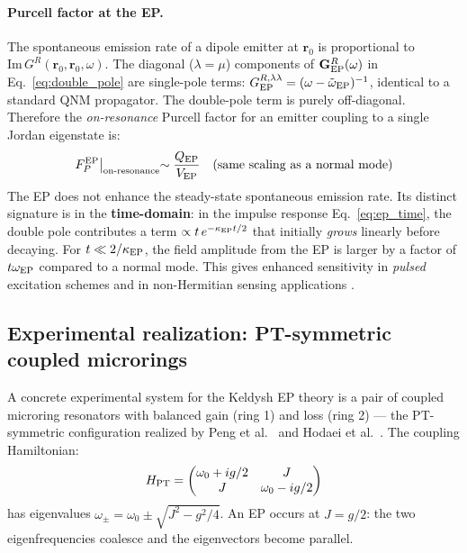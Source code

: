 \documentclass[12pt]{article}
\newcommand{\EP}{{\rm EP}}
\newcommand{\tomega}{\tilde{\omega}}
\begin{document}
\paragraph{Purcell factor at the EP.}
The spontaneous emission rate of a dipole emitter at $\mathbf{r}_0$ is
proportional to $\mathrm{Im}\,G^R(\mathbf{r}_0,\mathbf{r}_0,\omega)$.
The diagonal ($\lambda=\mu$) components of $\mathbf{G}_\EP^R(\omega)$
in Eq.~\eqref{eq:double_pole} are single-pole terms:
$G_\EP^{R,\lambda\lambda} = (\omega-\tomega_\EP)^{-1}$, identical to a
standard QNM propagator.  The double-pole term is purely off-diagonal.
Therefore the \emph{on-resonance} Purcell factor for an emitter coupling to
a single Jordan eigenstate is:
\begin{equation}
  F_P^\EP\bigl|_{\rm on\text{-}resonance} \sim \frac{Q_\EP}{V_\EP}
  \quad\text{(same scaling as a normal mode)}
  \label{eq:ep_purcell}
\end{equation}
The EP does not enhance the steady-state spontaneous emission rate.
Its distinct signature is in the \textbf{time-domain}: in the impulse
response Eq.~\eqref{eq:ep_time}, the double pole contributes a term
$\propto t\,e^{-\kappa_\EP t/2}$ that initially \emph{grows} linearly
before decaying.  For $t\ll 2/\kappa_\EP$, the field amplitude from
the EP is larger by a factor of $t\omega_\EP$ compared to a normal mode.
This gives enhanced sensitivity in \emph{pulsed} excitation schemes and
in non-Hermitian sensing applications \cite{Hodaei2017,Chen2017}.

\subsection{Experimental realization: PT-symmetric coupled microrings}
\label{sec:ep_experiment}

A concrete experimental system for the Keldysh EP theory is a pair of
coupled microring resonators with balanced gain (ring 1) and loss (ring 2)
--- the PT-symmetric configuration realized by Peng et al.\ \cite{Peng2014}
and Hodaei et al.\ \cite{Hodaei2017}.  The coupling Hamiltonian:
\begin{equation}
  H_{\rm PT} = \begin{pmatrix}
  \omega_0+ig/2 & J\\J & \omega_0-ig/2
  \end{pmatrix}
\end{equation}
has eigenvalues $\omega_\pm = \omega_0\pm\sqrt{J^2-g^2/4}$.  An EP occurs
at $J=g/2$: the two eigenfrequencies coalesce and the eigenvectors become
parallel.
\end{document}
